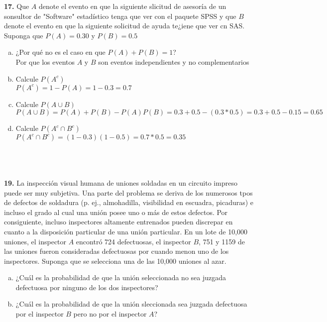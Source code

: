 \documentclass[12pt, letterpaper, spanish]{article}
\begin{document}
\textbf{17.} Que $A$ denote el evento en que la siguiente slicitud de asesoría de un sonsultor de "Software" estadístico tenga que ver con el paquete SPSS y que $B$ denote el evento en que la siguiente solicitud de ayuda te¿iene que ver cn SAS. Suponga que $P(A)=0.30$ y $P(B)=0.5$
\begin{enumerate}[a)]
    \item ¿Por qué no es el caso en que $P(A)+P(B)=1$?\\
    Por que los eventos $A$ y $B$ son eventos independientes y no complementarios
    \item Calcule $P(A^c)$\\
    $P(A^c)=1-P(A)=1-0.3=0.7$
    \item Calcule $P(A\cup B)$\\
    $P(A\cup B)=P(A)+P(B)-P(A)P(B)=0.3+0.5-(0.3*0.5)=0.3+0.5-0.15=0.65$
    \item Calcule $P(A^c\cap B^c)$\\
    $P(A^c\cap B^c)=(1-0.3)(1-0.5)=0.7*0.5=0.35$
\end{enumerate}\\ \\ \\

\textbf{19.} La inspección visual humana de uniones soldadas en un circuito impreso puede ser muy subjetiva. Una parte del problema se deriva de los numerosos tpos de defectos de soldadura (p. ej., almohadilla, visibilidad en escuadra, picaduras) e incluso el grado al cual una unión posee uno o más de estos defectos. Por consiguiente, incluso inspectores altamente entrenados pueden discrepar en cuanto a la disposición particular de una unión particular. En un lote de 10,000 uniones, el inspector $A$ encontró 724 defectuosas, el inspector $B$, 751 y 1159 de las uniones fueron consideradas defectuosas  por cuando menon uno de los inspectores. Suponga que se selecciona una de las  10,000 uniones al azar.
\begin{enumerate}[a)]
    \item ¿Cuál es la probabilidad de que la unión seleccionada no sea juzgada defectuosa por ninguno de los dos inspectores?
    \item ¿Cuál es la probabilidad de que la unión sleccionada sea juzgada defectuosa por el inspector $B$ pero no por el inspector $A$?
\end{enumerate}\\ \\ \\
\end{document}
